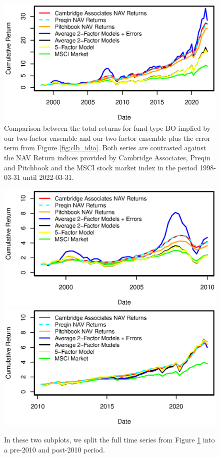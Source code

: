 \documentclass[12pt]{article}
\begin{document}
\begin{figure}[H]
	\centering
	\includegraphics{Figures/msci_market_factors/XTotalErrorSeriesBO}
	\caption{
		Comparison between the total returns for fund type BO implied by our two-factor ensemble and our two-factor ensemble plus the error term from Figure \ref{fig:clb_idio}.
		Both series are contrasted against the NAV Return indices provided by Cambridge Associates, Preqin and Pitchbook and the MSCI stock market index in the period 1998-03-31 until 2022-03-31.
		}
	\label{fig:clb_total}
\end{figure}

\begin{figure}[H]
	\centering
	\includegraphics{Figures/msci_market_factors/XTotalErrorSeriesBOpre2010}
	\includegraphics{Figures/msci_market_factors/XTotalErrorSeriesBOpost2010}
	\caption{
		In these two subplots, we split the full time series from Figure \ref{fig:clb_total} into a pre-2010 and post-2010 period.
	}
	\label{fig:clb_pre_post_2010}
\end{figure}
\end{document}
